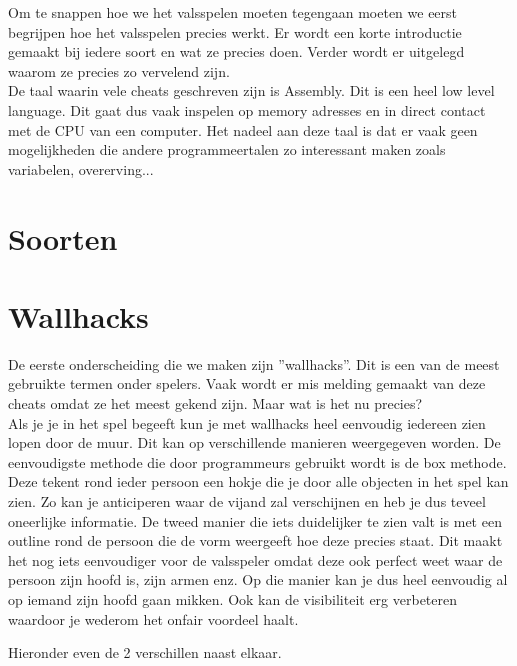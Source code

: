 \documentclass[pdftex,a4paper,12pt,twoside]{report}
\begin{document}
Om te snappen hoe we het valsspelen moeten tegengaan moeten we eerst begrijpen hoe het valsspelen precies werkt. Er wordt een korte introductie gemaakt bij iedere soort en wat ze precies doen. Verder wordt er uitgelegd waarom ze precies zo vervelend zijn.
\\

De taal waarin vele cheats geschreven zijn is Assembly. Dit is een heel low level language. Dit gaat dus vaak inspelen op memory adresses en in direct contact met de CPU van een computer. Het nadeel aan deze taal is dat er vaak geen mogelijkheden die andere programmeertalen zo interessant maken zoals variabelen, overerving...
\citep{assembly}

\section{Soorten}
\label{sec:soorten}
\section{Wallhacks}
\label{sec:walls}
De eerste onderscheiding die we maken zijn ''wallhacks''. Dit is een van de meest gebruikte termen onder spelers. Vaak wordt er mis melding gemaakt van deze cheats omdat ze het meest gekend zijn. Maar wat is het nu precies?
\\

Als je je in het spel begeeft kun je met wallhacks heel eenvoudig iedereen zien lopen door de muur. Dit kan op verschillende manieren weergegeven worden. De eenvoudigste methode die door programmeurs gebruikt wordt is de box methode. Deze tekent rond ieder persoon een hokje die je door alle objecten in het spel kan zien. Zo kan je anticiperen waar de vijand zal verschijnen en heb je dus teveel oneerlijke informatie. 
De tweed manier die iets duidelijker te zien valt is met een outline rond de persoon die de vorm weergeeft hoe deze precies staat. Dit maakt het nog iets eenvoudiger voor de valsspeler omdat deze ook perfect weet waar de persoon zijn hoofd is, zijn armen enz. Op die manier kan je dus heel eenvoudig al op iemand zijn hoofd gaan mikken. Ook kan de visibiliteit erg verbeteren waardoor je wederom het onfair voordeel haalt.

Hieronder even de 2 verschillen naast elkaar.
\end{document}
